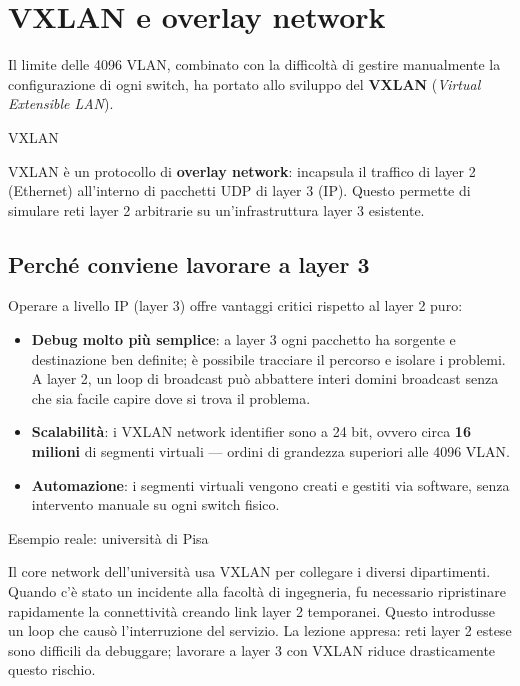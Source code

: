 \documentclass[
  italian,
  openany]{book}
\providecommand{\tightlist}{%
  \setlength{\itemsep}{0pt}\setlength{\parskip}{0pt}}
\begin{document}
\section{VXLAN e overlay network}\label{vxlan-e-overlay-network}

Il limite delle 4096 VLAN, combinato con la difficoltà di gestire
manualmente la configurazione di ogni switch, ha portato allo sviluppo
del \textbf{VXLAN} (\emph{Virtual Extensible LAN}).

\begin{calloutdefinition}{VXLAN}

VXLAN è un protocollo di \textbf{overlay network}: incapsula il traffico
di layer 2 (Ethernet) all'interno di pacchetti UDP di layer 3 (IP).
Questo permette di simulare reti layer 2 arbitrarie su un'infrastruttura
layer 3 esistente.

\end{calloutdefinition}

\subsection{Perché conviene lavorare a layer
3}\label{perchuxe9-conviene-lavorare-a-layer-3}

Operare a livello IP (layer 3) offre vantaggi critici rispetto al layer
2 puro:

\begin{itemize}
\tightlist
\item
  \textbf{Debug molto più semplice}: a layer 3 ogni pacchetto ha
  sorgente e destinazione ben definite; è possibile tracciare il
  percorso e isolare i problemi. A layer 2, un loop di broadcast può
  abbattere interi domini broadcast senza che sia facile capire dove si
  trova il problema.
\item
  \textbf{Scalabilità}: i VXLAN network identifier sono a 24 bit, ovvero
  circa \textbf{16 milioni} di segmenti virtuali --- ordini di grandezza
  superiori alle 4096 VLAN.
\item
  \textbf{Automazione}: i segmenti virtuali vengono creati e gestiti via
  software, senza intervento manuale su ogni switch fisico.
\end{itemize}

\begin{callouttip}{Esempio reale: università di Pisa}

Il core network dell'università usa VXLAN per collegare i diversi
dipartimenti. Quando c'è stato un incidente alla facoltà di ingegneria,
fu necessario ripristinare rapidamente la connettività creando link
layer 2 temporanei. Questo introdusse un loop che causò l'interruzione
del servizio. La lezione appresa: reti layer 2 estese sono difficili da
debuggare; lavorare a layer 3 con VXLAN riduce drasticamente questo
rischio.

\end{callouttip}
\end{document}
